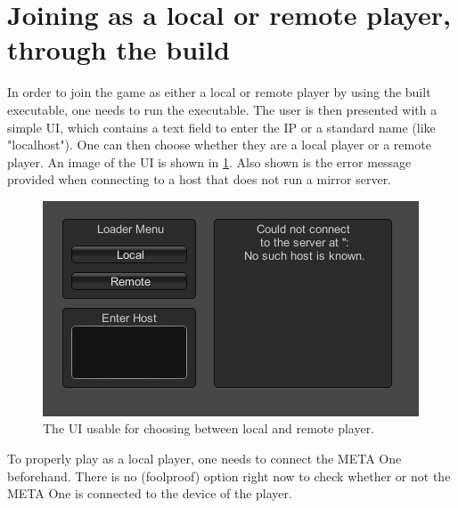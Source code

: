 \documentclass[]{report}
\begin{document}
\section*{Joining as a local or remote player, through the build}
In order to join the game as either a local or remote player by using the built
executable, one needs to run the executable. The user is then presented with a
simple UI, which contains a text field to enter the IP or a standard name (like
"localhost"). One can then choose whether they are a local player or a remote
player. An image of the UI is shown in \ref{fig:remotelocalui}. Also shown is the
error message provided when connecting to a host that does not run a mirror server.
\begin{figure}[!ht]
    \centering
    \includegraphics[scale = 0.6]{RemoteLocalUI}
    \caption{The UI usable for choosing between local and remote player.}
    \label{fig:remotelocalui}
\end{figure}

To properly play as a local player, one needs to connect the META One beforehand.
There is no (foolproof) option right now to check whether or not the META One is
connected to the device of the player.
\end{document}
